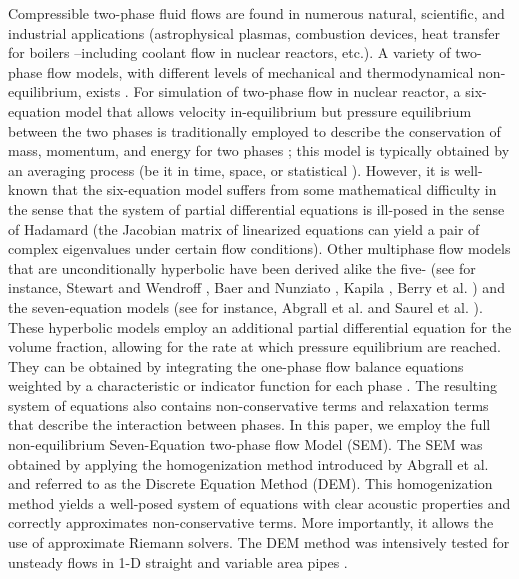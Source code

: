 \documentclass[preprint,10pt]{elsarticle}
\begin{document}
Compressible two-phase fluid flows are found in numerous natural, scientific, and industrial applications (astrophysical plasmas, 
combustion devices, heat transfer for boilers --including coolant flow in nuclear reactors, etc.). 
A variety of two-phase flow models, with different levels of mechanical and thermodynamical non-equilibrium, exists . 
For simulation of two-phase flow in nuclear reactor, a six-equation model that allows velocity in-equilibrium but pressure equilibrium between the two phases is traditionally employed to describe the conservation of mass, 
momentum, and energy for two phases \cite{Stadtke}; this model is typically obtained by an averaging process (be it in time, space,
or statistical \cite{BruceStewart1984363}). However, it is well-known that the six-equation model 
suffers from some mathematical difficulty in the sense that the system of partial differential equations is ill-posed in the sense of Hadamard 
(the Jacobian matrix of linearized equations can yield a pair of complex eigenvalues under certain flow conditions). 
Other multiphase flow models that are unconditionally hyperbolic have been derived alike the five- (see for instance, Stewart and Wendroff \cite{BruceStewart1984363}, 
Baer and Nunziato \cite{BaerNunziato}, Kapila \cite{Kapila_2001,Berry_NED2010}, Berry et al. \cite{Berry_1985}) and the seven-equation models (see for instance, Abgrall et al. \cite{AbgrallandSaurel2003} and Saurel et al. \cite{Saurel_2001a,Saurel_2001b}). These hyperbolic models employ an additional partial differential equation for the volume fraction, allowing for the rate at which pressure equilibrium are reached.  They can be obtained by integrating the one-phase flow balance equations weighted by a characteristic 
or indicator function for each phase \cite{DrewPassman}. The resulting system of equations also contains non-conservative terms and relaxation terms that describe the interaction between phases.
In this paper, we employ the full non-equilibrium Seven-Equation two-phase flow Model 
(SEM). The SEM was obtained by applying the homogenization method introduced by Abgrall et al. \cite{AbgrallandSaurel2003} and referred to as the Discrete Equation Method (DEM). This homogenization method yields a well-posed system of equations with clear acoustic properties and correctly approximates non-conservative terms. More importantly, it allows the use of approximate Riemann solvers. The DEM method was intensively tested for unsteady flows in 1-D straight and variable area pipes \cite{AbgrallandSaurel2003, Chinnayya2004, Berry_NED2010}.
\end{document}
